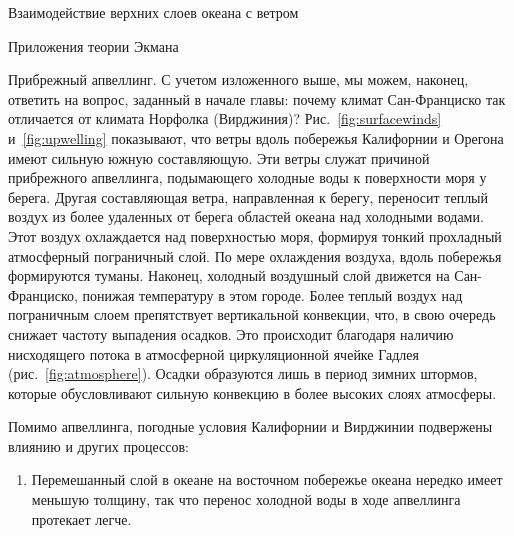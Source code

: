 \begin{chapter}{Взаимодействие верхних слоев океана с ветром}
\begin{section}{Приложения теории Экмана}
\begin{paragraph}{Прибрежный апвеллинг.}
С учетом изложенного выше, мы можем, наконец, ответить на вопрос, заданный
в начале главы: почему климат Сан-Франциско так отличается от климата 
Норфолка (Вирджиния)? Рис.~\ref{fig:surfacewinds} и~\ref{fig:upwelling}
показывают, что ветры вдоль побережья Калифорнии и Орегона имеют сильную
южную составляющую. Эти ветры служат причиной прибрежного 
апвеллинга, подымающего холодные воды 
к поверхности моря у берега. 
Другая составляющая ветра, направленная к берегу, переносит
теплый воздух из более удаленных от берега областей океана над холодными водами. Этот воздух охлаждается над поверхностью моря, формируя тонкий
прохладный атмосферный пограничный слой. По мере охлаждения воздуха, вдоль
побережья формируются туманы. Наконец, холодный воздушный слой движется на
Сан-Франциско, понижая температуру в этом городе. Более теплый воздух над
пограничным слоем препятствует вертикальной конвекции, что, в свою очередь
снижает частоту выпадения осадков. Это происходит благодаря наличию
нисходящего потока в атмосферной циркуляционной ячейке 
Гадлея (рис.~\ref{fig:atmosphere}). Осадки образуются лишь в период зимних
штормов, которые обусловливают сильную конвекцию в более высоких слоях атмосферы.
%

Помимо апвеллинга, погодные условия Калифорнии
и Вирджинии подвержены влиянию и других процессов:
%
%
\begin{enumerate}
\item 
Перемешанный слой в океане 
на восточном побережье океана нередко имеет меньшую толщину, так что перенос
холодной воды в ходе апвеллинга протекает легче.
%


\end{enumerate}
\end{paragraph}
\end{section}
\end{chapter}
